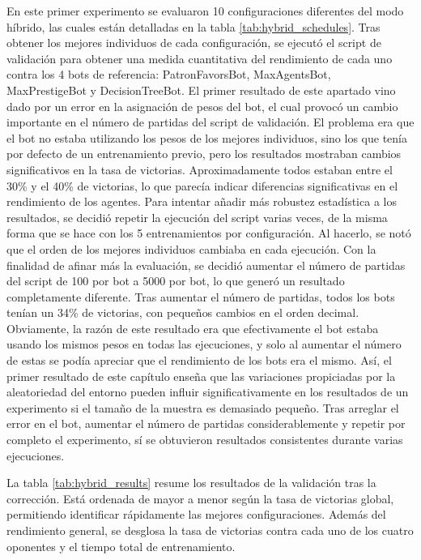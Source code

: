 En este primer experimento se evaluaron 10 configuraciones diferentes del modo híbrido, las cuales están detalladas en la tabla \ref{tab:hybrid_schedules}. Tras obtener los mejores individuos de cada configuración, se ejecutó el script de validación para obtener una medida cuantitativa del rendimiento de cada uno contra los 4 bots de referencia: PatronFavorsBot, MaxAgentsBot, MaxPrestigeBot y DecisionTreeBot. El primer resultado de este apartado vino dado por un error en la asignación de pesos del bot, el cual provocó un cambio importante en el número de partidas del script de validación. El problema era que el bot no estaba utilizando los pesos de los mejores individuos, sino los que tenía por defecto de un entrenamiento previo, pero los resultados mostraban cambios significativos en la tasa de victorias. Aproximadamente todos estaban entre el 30\% y el 40\% de victorias, lo que parecía indicar diferencias significativas en el rendimiento de los agentes. Para intentar añadir más robustez estadística a los resultados, se decidió repetir la ejecución del script varias veces, de la misma forma que se hace con los 5 entrenamientos por configuración. Al hacerlo, se notó que el orden de los mejores individuos cambiaba en cada ejecución. Con la finalidad de afinar más la evaluación, se decidió aumentar el número de partidas del script de 100 por bot a 5000 por bot, lo que generó un resultado completamente diferente. Tras aumentar el número de partidas, todos los bots tenían un 34\% de victorias, con pequeños cambios en el orden decimal. Obviamente, la razón de este resultado era que efectivamente el bot estaba usando los mismos pesos en todas las ejecuciones, y solo al aumentar el número de estas se podía apreciar que el rendimiento de los bots era el mismo. Así, el primer resultado de este capítulo enseña que las variaciones propiciadas por la aleatoriedad del entorno pueden influir significativamente en los resultados de un experimento si el tamaño de la muestra es demasiado pequeño. Tras arreglar el error en el bot, aumentar el número de partidas considerablemente y repetir por completo el experimento, sí se obtuvieron resultados consistentes durante varias ejecuciones.

La tabla \ref{tab:hybrid_results} resume los resultados de la validación tras la corrección. Está ordenada de mayor a menor según la tasa de victorias global, permitiendo identificar rápidamente las mejores configuraciones. Además del rendimiento general, se desglosa la tasa de victorias contra cada uno de los cuatro oponentes y el tiempo total de entrenamiento.


